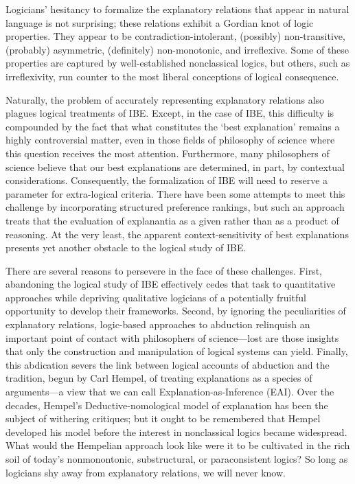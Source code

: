 \documentclass{article}
\theoremstyle{definition}
\theoremstyle{definition}
\theoremstyle{definition}
\theoremstyle{definition}
\theoremstyle{remark}
\theoremstyle{definition}
\theoremstyle{definition}
\begin{document}
  Logicians' hesitancy to formalize the explanatory relations that appear in natural language is not surprising; these relations exhibit a Gordian knot of logic properties. They appear to be contradiction-intolerant, (possibly) non-transitive, (probably) asymmetric, (definitely) non-monotonic, and irreflexive. Some of these properties are captured by well-established nonclassical logics, but others, such as irreflexivity,  run counter to the most liberal conceptions of logical consequence.
 
 Naturally, the problem of accurately representing explanatory relations also plagues logical treatments of IBE. Except, in the case of IBE, this difficulty is compounded by the fact that what constitutes the `best explanation' remains a highly controversial matter, even in those fields of philosophy of science where this question receives the most  attention.  Furthermore, many philosophers of science believe that our best explanations are determined, in part, by contextual considerations.  Consequently, the formalization of IBE will need to reserve a parameter for extra-logical criteria. There have been some attempts to meet this challenge by incorporating structured preference rankings, but such an approach treats that the evaluation of explanantia as a given rather than as a product of reasoning. At the very least, the apparent context-sensitivity of best explanations presents yet another obstacle to the logical study of IBE. 
 
 There are several reasons to persevere in the face of these challenges. First, abandoning the logical study of IBE effectively cedes that task to quantitative approaches while depriving qualitative logicians of a potentially fruitful opportunity to develop their frameworks. Second, by ignoring the peculiarities of explanatory relations, logic-based approaches to abduction relinquish an important point of contact with philosophers of science---lost are those insights that only the construction and manipulation of logical systems can yield. Finally, this abdication severs the link between logical accounts of abduction and the tradition, begun by Carl Hempel, of treating explanations as a species of arguments---a view that we can call Explanation-as-Inference (EAI). Over the decades, Hempel's Deductive-nomological model of explanation has been the subject of withering critiques; but it ought to be remembered that Hempel developed his model before the interest in nonclassical logics became widespread. What would the Hempelian approach look like were it to be cultivated in the rich soil of today's nonmonontonic, substructural, or paraconsistent logics? So long as logicians shy away from explanatory relations, we will never know.
 
\end{document}
